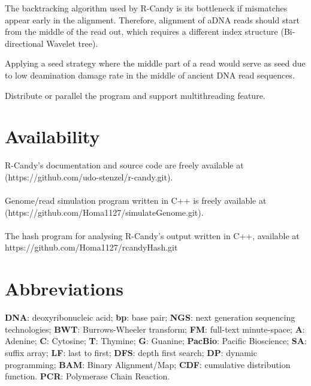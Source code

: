 \documentclass[11pt,a4paper]{report}
\begin{document}

The backtracking algorithm used by R-Candy is its bottleneck if mismatches 
appear early in the alignment. 
Therefore, alignment of aDNA reads should start from the middle of the read 
out, which requires a different index structure (Bi-directional Wavelet tree).

Applying a seed strategy where the middle part of a read would serve as seed
due to low deamination damage rate in the middle of  ancient DNA read sequences.

Distribute or parallel the program and support multithreading feature.




\section{Availability} \label{Availability}

R-Candy's documentation and source code are freely available at\\
 (https://github.com/udo-stenzel/r-candy.git).
\\\\
Genome/read simulation program written in C++ is freely available at
(https://github.com/Homa1127/simulateGenome.git).
\\\\
The hash program for analysing R-Candy's output written in C++, available at
https://github.com/Homa1127/rcandyHash.git




\section{Abbreviations} \label{Abbreviations}

\textbf{DNA}: deoxyribonucleic acid;
\textbf{bp}: base pair;
\textbf{NGS}: next generation sequencing technologies;
\textbf{BWT}: Burrows-Wheeler transform;
\textbf{FM}: full-text minute-space;
\textbf{A}: Adenine;
\textbf{C}: Cytosine;
\textbf{T}: Thymine;
\textbf{G}: Guanine;
\textbf{PacBio}: Pacific Bioscience;
\textbf{SA}: suffix array;
\textbf{LF}: last to first;
\textbf{DFS}: depth first search;
\textbf{DP}: dynamic programming;
\textbf{BAM}: Binary Alignment/Map;
\textbf{CDF}: cumulative distribution function.
\textbf{PCR}: Polymerase Chain Reaction.
\end{document}
